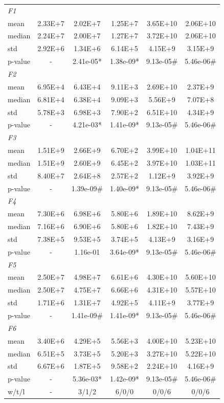 \documentclass[12pt]{ctexart}
\begin{document}
{\begin{longtable}{lccccc}
\multicolumn{6}{l}{\textit{F1}} \\
mean & 2.33E+7 & 2.02E+7 & 1.25E+7 & 3.65E+10 & 2.06E+10 \\
median & 2.24E+7 & 2.00E+7 & 1.27E+7 & 3.72E+10 & 2.06E+10 \\
std & 2.92E+6 & 1.34E+6 & 6.14E+5 & 4.15E+9 & 3.15E+9 \\
p-value & - & 2.41e-05* & 1.38e-09* & 9.13e-05\# & 5.46e-06\# \\
\hline
\multicolumn{6}{l}{\textit{F2}} \\
mean & 6.95E+4 & 6.43E+4 & 9.11E+3 & 2.69E+10 & 2.37E+9 \\
median & 6.81E+4 & 6.38E+4 & 9.09E+3 & 5.56E+9 & 7.07E+8 \\
std & 5.78E+3 & 6.98E+3 & 7.90E+2 & 6.51E+10 & 4.34E+9 \\
p-value & - & 4.21e-03* & 1.41e-09* & 9.13e-05\# & 5.46e-06\# \\
\hline
\multicolumn{6}{l}{\textit{F3}} \\
mean & 1.51E+9 & 2.66E+9 & 6.70E+2 & 3.99E+10 & 1.04E+11 \\
median & 1.51E+9 & 2.60E+9 & 6.45E+2 & 3.97E+10 & 1.03E+11 \\
std & 8.40E+7 & 2.64E+8 & 2.57E+2 & 1.12E+9 & 3.92E+9 \\
p-value & - & 1.39e-09\# & 1.40e-09* & 9.13e-05\# & 5.46e-06\# \\
\hline
\multicolumn{6}{l}{\textit{F4}} \\
mean & 7.30E+6 & 6.98E+6 & 5.80E+6 & 1.89E+10 & 8.62E+9 \\
median & 7.16E+6 & 6.90E+6 & 5.80E+6 & 1.82E+10 & 7.43E+9 \\
std & 7.38E+5 & 9.53E+5 & 3.74E+5 & 4.13E+9 & 3.16E+9 \\
p-value & - & 1.16e-01 & 3.64e-09* & 9.13e-05\# & 5.46e-06\# \\
\hline
\multicolumn{6}{l}{\textit{F5}} \\
mean & 2.50E+7 & 4.98E+7 & 6.61E+6 & 4.30E+10 & 5.60E+10 \\
median & 2.50E+7 & 4.75E+7 & 6.66E+6 & 4.31E+10 & 5.57E+10 \\
std & 1.71E+6 & 1.31E+7 & 4.92E+5 & 4.11E+9 & 3.77E+9 \\
p-value & - & 1.41e-09\# & 1.41e-09* & 9.13e-05\# & 5.46e-06\# \\
\hline
\multicolumn{6}{l}{\textit{F6}} \\
mean & 3.40E+6 & 4.29E+5 & 5.56E+3 & 4.00E+10 & 5.23E+10 \\
median & 6.51E+5 & 3.73E+5 & 5.20E+3 & 3.27E+10 & 5.22E+10 \\
std & 6.67E+6 & 1.87E+5 & 9.58E+2 & 2.24E+10 & 4.16E+9 \\
p-value & - & 5.36e-03* & 1.42e-09* & 9.13e-05\# & 5.46e-06\# \\
\hline
w/t/l & - & 3/1/2 & 6/0/0 & 0/0/6 & 0/0/6 \\
\end{longtable}
}
\end{document}
